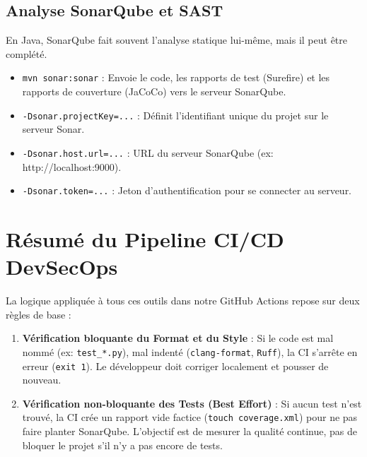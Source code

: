 \documentclass[11pt, a4paper]{report}
\begin{document}
\subsection{Analyse SonarQube et SAST}
En Java, SonarQube fait souvent l'analyse statique lui-même, mais il peut être complété.
\begin{itemize}[leftmargin=1.5cm]
    \item \texttt{mvn sonar:sonar} : Envoie le code, les rapports de test (Surefire) et les rapports de couverture (JaCoCo) vers le serveur SonarQube.
    \item \texttt{-Dsonar.projectKey=...} : Définit l'identifiant unique du projet sur le serveur Sonar.
    \item \texttt{-Dsonar.host.url=...} : URL du serveur SonarQube (ex: http://localhost:9000).
    \item \texttt{-Dsonar.token=...} : Jeton d'authentification pour se connecter au serveur.
\end{itemize}

\newpage

\section{Résumé du Pipeline CI/CD DevSecOps}
La logique appliquée à tous ces outils dans notre GitHub Actions repose sur deux règles de base :
\begin{enumerate}
    \item \textbf{Vérification bloquante du Format et du Style} : Si le code est mal nommé (ex: \texttt{test\_*.py}), mal indenté (\texttt{clang-format}, \texttt{Ruff}), la CI s'arrête en erreur (\texttt{exit 1}). Le développeur doit corriger localement et pousser de nouveau.
    \item \textbf{Vérification non-bloquante des Tests (Best Effort)} : Si aucun test n'est trouvé, la CI crée un rapport vide factice (\texttt{touch coverage.xml}) pour ne pas faire planter SonarQube. L'objectif est de mesurer la qualité continue, pas de bloquer le projet s'il n'y a pas encore de tests.
\end{enumerate}
\end{document}
